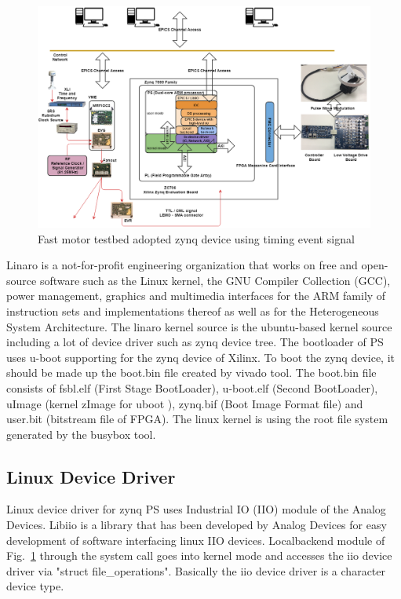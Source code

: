 \documentclass[a4paper,
              ]{jacow}
\begin{document}
\begin{figure}[!tbh]
	\centering
	\includegraphics*[width=\textwidth,height=0.7\textwidth]{motor-testbed}
	\caption{Fast motor testbed adopted zynq device using timing event signal}
	\label{stepper}
\end{figure}

Linaro is a not-for-profit engineering organization that works on free and open-source software such as the Linux kernel, the GNU Compiler Collection (GCC), power management, graphics and multimedia interfaces for the ARM family of instruction sets and implementations thereof as well as for the Heterogeneous System Architecture\cite{linaro}.   
The linaro kernel source is the ubuntu-based kernel source including a lot of device driver such as zynq device tree.
The bootloader of PS uses u-boot\cite{u-boot} supporting for the zynq device of Xilinx. To boot the zynq device, it should be made up the boot.bin file created by vivado\cite{vivado} tool. The boot.bin\cite{boot-bin} file consists of fsbl.elf (First Stage BootLoader), u-boot.elf (Second BootLoader), uImage (kernel zImage for uboot ), zynq.bif (Boot Image Format file) and user.bit (bitstream file of FPGA). The linux kernel is using the root file system generated by the busybox\cite{busybox} tool.

\subsection{Linux Device Driver}
Linux device driver for zynq PS uses Industrial IO (IIO) module of the Analog Devices. Libiio\cite{iio} is a library that has been developed by Analog Devices for easy development of software interfacing linux IIO devices. Localbackend module of Fig.~\ref{stepper} through the system call goes into kernel mode and accesses the iio device driver via "struct file\_operations". Basically the iio device driver is a character device type.
\end{document}
